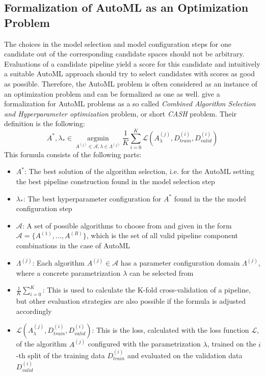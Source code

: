 \subsection{Formalization of AutoML as an Optimization Problem}
\label{sec:theory:automl:optimization}
The choices in the model selection and model configuration steps for one candidate out of the corresponding candidate spaces should not be arbitrary.
Evaluations of a candidate pipeline yield a score for this candidate and intuitively a suitable AutoML approach should try to select candidates with scores as good as possible.
Therefore, the AutoML problem is often considered as an instance of an optimization problem and can be formalized as one as well.\newline
\textcite{Thornton-AutoWeka} give a formalization for AutoML problems as a so called \textit{Combined Algorithm Selection and Hyperparameter optimization} problem, or short \textit{CASH} problem.
Their definition is the following:
\begin{equation*}
    A^*, \lambda_* \in \> \underset{A^{(j)} \in \mathcal{A},\lambda \in \Lambda^{(j)}}{\mathrm{argmin}} \> \frac{1}{K} \sum_{i=0}^K \mathcal{L} (A_\lambda^{(j)}, D_{\textit{train}}^{(i)}, D_{\textit{valid}}^{(i)})
\end{equation*}
This formula consists of the following parts:
\begin{itemize}
    \item $A^*$: The best solution of the algorithm selection, i.e. for the AutoML setting the best pipeline construction found in the model selection step
    \item $\lambda_*$: The best hyperparameter configuration for $A^*$ found in the the model configuration step
    \item $\mathcal{A}$: A set of possible algorithms to choose from and given in the form $\mathcal{A} = \{A^{(1)}, ..., A^{(R)} \}$, which is the set of all valid pipeline component combinations in the case of AutoML
    \item $\Lambda^{(j)}$: Each algorithm $A^{(j)} \in \mathcal{A}$ has a parameter configuration domain $\Lambda^{(j)}$, where a concrete parametrization $\lambda$ can be selected from
    \item $\frac{1}{K} \sum_{i=0}^K$: This is used to calculate the K-fold cross-validation of a pipeline, but other evaluation strategies are also possible if the formula is adjusted accordingly
    \item $\mathcal{L} (A_\lambda^{(j)}, D_{\textit{train}}^{(i)}, D_{\textit{valid}}^{(i)})$: This is the loss, calculated with the loss function $\mathcal{L}$, of the algorithm $A^{(j)}$ configured with the parametrization $\lambda$, trained on the $i$-th split of the training data $D_{\textit{train}}^{(i)}$ and evaluated on the validation data $D_{\textit{valid}}^{(i)}$
\end{itemize}
